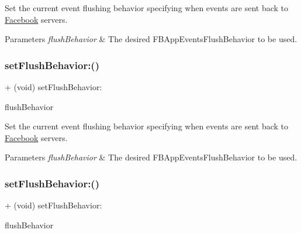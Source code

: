Set the current event flushing behavior specifying when events are sent back to \hyperlink{interfaceFacebook}{Facebook} servers.


\begin{DoxyParams}{Parameters}
{\em flush\+Behavior} & The desired {\ttfamily F\+B\+App\+Events\+Flush\+Behavior} to be used. \\
\hline
\end{DoxyParams}
\mbox{\label{interfaceFBAppEvents_a0c6f0d165c7fba6eab71ff3228e9b848}} 
\subsubsection{\texorpdfstring{set\+Flush\+Behavior\+:()}{setFlushBehavior:()}\hspace{0.1cm}{\footnotesize\ttfamily [4/5]}}
{\footnotesize\ttfamily + (void) set\+Flush\+Behavior\+: \begin{DoxyParamCaption}\item[{(F\+B\+App\+Events\+Flush\+Behavior)}]{flush\+Behavior }\end{DoxyParamCaption}}

Set the current event flushing behavior specifying when events are sent back to \hyperlink{interfaceFacebook}{Facebook} servers.


\begin{DoxyParams}{Parameters}
{\em flush\+Behavior} & The desired {\ttfamily F\+B\+App\+Events\+Flush\+Behavior} to be used. \\
\hline
\end{DoxyParams}
\mbox{\label{interfaceFBAppEvents_a0c6f0d165c7fba6eab71ff3228e9b848}} 
\subsubsection{\texorpdfstring{set\+Flush\+Behavior\+:()}{setFlushBehavior:()}\hspace{0.1cm}{\footnotesize\ttfamily [5/5]}}
{\footnotesize\ttfamily + (void) set\+Flush\+Behavior\+: \begin{DoxyParamCaption}\item[{(F\+B\+App\+Events\+Flush\+Behavior)}]{flush\+Behavior }\end{DoxyParamCaption}}

